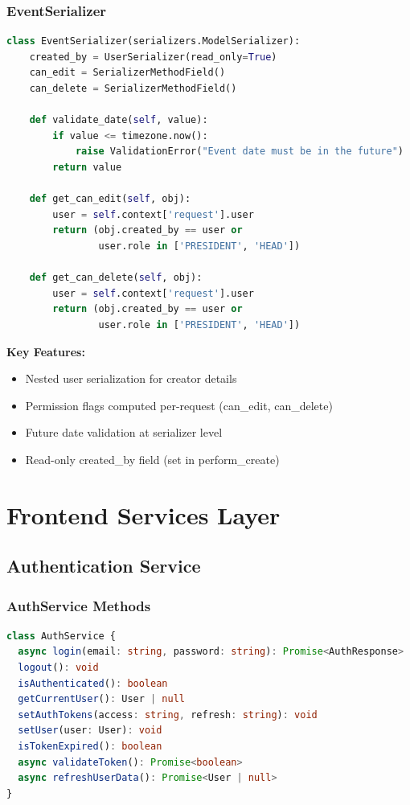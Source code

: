 \documentclass[11pt,a4paper]{article}
\begin{document}
\subsubsection{EventSerializer}
\begin{lstlisting}[language=Python]
class EventSerializer(serializers.ModelSerializer):
    created_by = UserSerializer(read_only=True)
    can_edit = SerializerMethodField()
    can_delete = SerializerMethodField()
    
    def validate_date(self, value):
        if value <= timezone.now():
            raise ValidationError("Event date must be in the future")
        return value
    
    def get_can_edit(self, obj):
        user = self.context['request'].user
        return (obj.created_by == user or 
                user.role in ['PRESIDENT', 'HEAD'])
    
    def get_can_delete(self, obj):
        user = self.context['request'].user
        return (obj.created_by == user or 
                user.role in ['PRESIDENT', 'HEAD'])
\end{lstlisting}

\textbf{Key Features:}
\begin{itemize}[leftmargin=*]
    \item Nested user serialization for creator details
    \item Permission flags computed per-request (can\_edit, can\_delete)
    \item Future date validation at serializer level
    \item Read-only created\_by field (set in perform\_create)
\end{itemize}

\section{Frontend Services Layer}

\subsection{Authentication Service}

\subsubsection{AuthService Methods}
\begin{lstlisting}[language=TypeScript]
class AuthService {
  async login(email: string, password: string): Promise<AuthResponse>
  logout(): void
  isAuthenticated(): boolean
  getCurrentUser(): User | null
  setAuthTokens(access: string, refresh: string): void
  setUser(user: User): void
  isTokenExpired(): boolean
  async validateToken(): Promise<boolean>
  async refreshUserData(): Promise<User | null>
}
\end{lstlisting}
\end{document}
